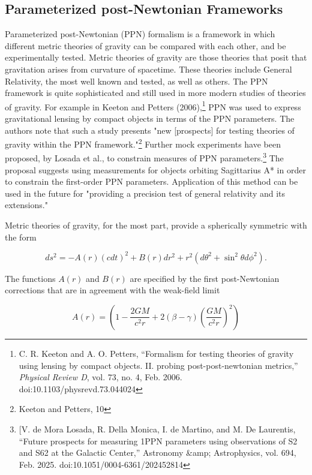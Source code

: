 \documentclass[11pt]{article}
\begin{document}
\subsection{Parameterized post-Newtonian Frameworks}

Parameterized post-Newtonian (PPN) formalism is a framework in which different metric theories of gravity can be compared with each other, and be experimentally tested. Metric theories of gravity are those theories that posit that gravitation arises from curvature of spacetime. These theories include General Relativity, the most well known and tested, as well as others. The PPN framework is quite sophisticated and still used in more modern studies of theories of gravity. For example in Keeton and Petters (2006),\footnote{C. R. Keeton and A. O. Petters, “Formalism for testing theories of gravity using lensing by compact objects. II. probing post-post-newtonian metrics,” \textit{Physical Review D}, vol. 73, no. 4, Feb. 2006. doi:10.1103/physrevd.73.044024 } PPN was used to express gravitational lensing by compact objects in terms of the PPN parameters. The authors note that such a study presents "new [prospects] for testing theories of gravity within the PPN framework."\footnote{Keeton and Petters, 10} Further mock experiments have been proposed, by Losada et al., to constrain measures of PPN parameters.\footnote{[V. de Mora Losada, R. Della Monica, I. de Martino, and M. De Laurentis, “Future prospects for measuring 1PPN parameters using observations of S2 and S62 at the Galactic Center,” Astronomy \&amp; Astrophysics, vol. 694, Feb. 2025. doi:10.1051/0004-6361/202452814 } The proposal suggests using measurements for objects orbiting Sagittarius A* in order to constrain the first-order PPN parameters. Application of this method can be used in the future for "providing a precision test of general relativity and its extensions."

Metric theories of gravity, for the most part, provide a spherically symmetric with the form

\begin{equation}
    \label{eq:ppnmetric}
    ds^2 = -A(r)(cdt)^2 + B(r) dr^2 + r^2(d\theta^2 + \sin^2\theta d\phi^2).
\end{equation}

The functions $A(r)$ and $B(r)$ are specified by the first post-Newtonian corrections that are in agreement with the weak-field limit

\begin{equation}
    \label{eq:PPNA__r}
    A(r) = \left(1 - \frac{2GM}{c^2r} + 2(\beta - \gamma) \left(\frac{GM}{c^2r}\right)^2\right)
\end{equation}
\end{document}
